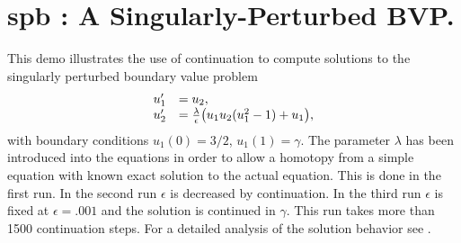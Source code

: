 \documentclass[12pt]{report}
\def\eps{\epsilon}
\begin{document}
\section{ spb : A Singularly-Perturbed BVP.} \label{sec:Demos_spb}
This demo illustrates the use of continuation to compute 
solutions to the singularly perturbed boundary value problem
\begin{equation} \begin{array}{cl}
  u_1 ' &= u_2  ,  \\
  u_2 ' &= {\lambda \over \eps} \bigl(
  u_1 u_2 (u_1^2 - 1) + u_1
  \bigr)  , \\ \end{array} \end{equation}
with boundary conditions $u_1(0)=3/2$,  $u_1(1)=\gamma.$
The parameter $\lambda$ has been introduced into the equations in order
to allow a homotopy from a simple equation with known exact solution
to the actual equation. This is done in the first run.
In the second run $\eps$ is decreased by continuation.
In the third run $\eps$ is fixed at $\eps=.001$ and the solution is continued 
in $\gamma$.
This run takes more than 1500 continuation steps.
For a detailed analysis of the solution behavior see 
 \citeyear{JL:82}.
\end{document}
